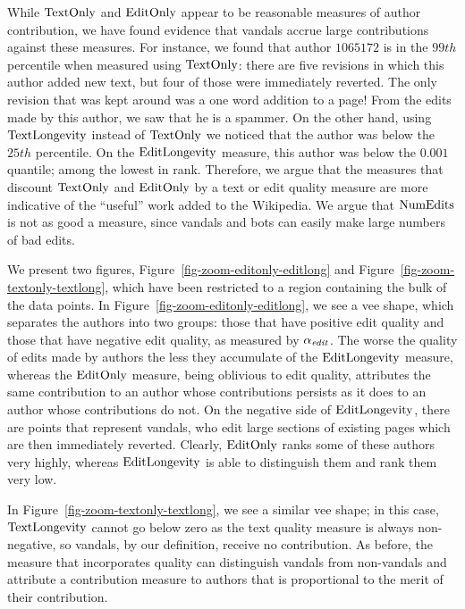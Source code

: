 While $\text{TextOnly}$ and $\text{EditOnly}$ appear to be reasonable measures 
of author contribution, we have found evidence that vandals
accrue large contributions against these measures.
For instance, we found that author $1065172$ is in the $99th$ 
percentile when measured using $\text{TextOnly}$:
there are five revisions in which this author added new text, but
four of those were immediately reverted.
The only revision that was kept around was a one word addition to a
page!
From the edits made by this author, we saw that he is a spammer.
On the other hand, using $\text{TextLongevity}$ instead of $\text{TextOnly}$ we
noticed that the author was below the $25th$ percentile.
On the $\text{EditLongevity}$ measure, this author was below the 
$0.001$ quantile; among the lowest in rank.
Therefore, we argue that the measures that discount $\text{TextOnly}$ and 
$\text{EditOnly}$ by a text or edit quality measure are more indicative
of the ``useful'' work added to the Wikipedia.
We argue that $\text{NumEdits}$ is not as good a measure, since 
vandals and bots can easily make large numbers of bad edits.

We present two figures, Figure~\ref{fig-zoom-editonly-editlong}
and Figure~\ref{fig-zoom-textonly-textlong},
which have been restricted to a region containing the
bulk of the data points.
In Figure~\ref{fig-zoom-editonly-editlong},
we see a vee shape, which separates the authors into
two groups: those that have positive edit quality and those
that have negative edit quality, as measured by $\alpha_\text{\textit{edit}}$.
The worse the quality of edits made by authors the less they
accumulate of the $\text{EditLongevity}$ measure, whereas the $\text{EditOnly}$
measure, being oblivious to edit quality, attributes the same
contribution to an author whose contributions persists as it 
does to an author whose contributions do not.
On the negative side of $\text{EditLongevity}$, there are points that represent
vandals, who edit large sections of existing pages which are
then immediately reverted.
Clearly, $\text{EditOnly}$ ranks some of these authors very highly,
whereas $\text{EditLongevity}$ is able to distinguish them and rank
them very low.

In Figure~\ref{fig-zoom-textonly-textlong},
we see a similar vee shape; in this case, $\text{TextLongevity}$
cannot go below zero as the text quality measure is always 
non-negative, so vandals, by our definition, receive no 
contribution.
As before, the measure that incorporates quality can 
distinguish vandals from non-vandals and attribute a contribution
measure to authors that is proportional to the merit of their
contribution.

